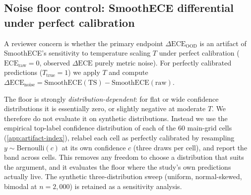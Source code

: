 \documentclass[review,12pt,nonatbib]{elsarticle}
\begin{document}
\subsection{Noise floor control: SmoothECE differential under perfect calibration}
\label{sec:noise_floor}
A reviewer concern is whether the primary endpoint
$\Delta\text{ECE}_{\text{OOD}}$ is an artifact of SmoothECE's
sensitivity to temperature scaling $T$ under perfect calibration
($\text{ECE}_{\text{raw}} = 0$, observed $\Delta\text{ECE}$ purely
metric noise). For perfectly calibrated predictions
($T_{\text{true}}=1$) we apply $T$ and compute
$\Delta\text{ECE}_{\text{noise}} = \text{SmoothECE}(\text{TS}) - \text{SmoothECE}(\text{raw})$.

The floor is strongly \emph{distribution-dependent}: for flat or wide
confidence distributions it is essentially zero, or slightly negative at
moderate $T$. We therefore do not evaluate it on synthetic
distributions. Instead we use the empirical top-label confidence
distribution of each of the 60 main-grid cells
(\ref{app:artifact-index}), relabel each cell as
perfectly calibrated by resampling $y \sim \mathrm{Bernoulli}(c)$ at its
own confidence $c$ (three draws per cell), and report the band across
cells. This removes any freedom to choose a distribution that suits the
argument, and it evaluates the floor where the study's own predictions
actually live. The synthetic three-distribution sweep (uniform,
normal-skewed, bimodal at $n=2{,}000$) is retained as a sensitivity
analysis.
\end{document}
